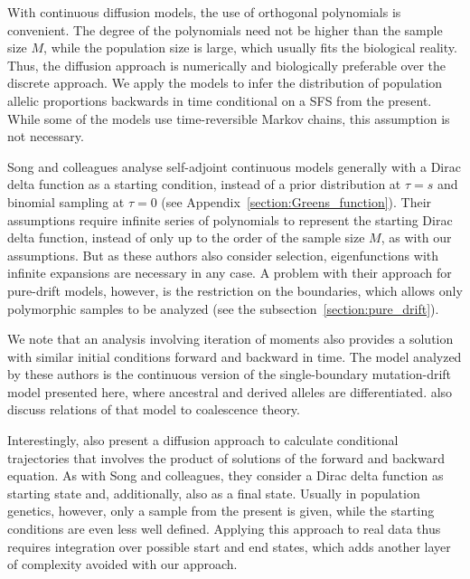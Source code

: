\documentclass[preprint]{elsarticle}
\begin{document}
With continuous diffusion models, the use of orthogonal polynomials is convenient. The degree of the polynomials need not be higher than the sample size $M$, while the population size is large, which usually fits the biological reality. Thus, the diffusion approach is numerically and biologically preferable over the discrete approach. We apply the models to infer the distribution of population allelic proportions backwards in time conditional on a SFS from the present. While some of the models use time-reversible Markov chains, this assumption is not necessary.%

Song and colleagues \citep{Song12,Stei13,Stei14,Zivk15} analyse self-adjoint continuous models generally with a Dirac delta function as a starting condition, instead of a prior distribution at $\tau=s$ and binomial sampling at $\tau=0$ (see Appendix~\ref{section:Greens_function}). Their assumptions require infinite series of polynomials to represent the starting Dirac delta function, instead of only up to the order of the sample size $M$, as with our assumptions. But as these authors also consider selection, eigenfunctions with infinite expansions are necessary in any case. A problem with their approach for pure-drift models, however, is the restriction on the boundaries, which allows only polymorphic samples to be analyzed (see the subsection~\ref{section:pure_drift}).

We note that an analysis involving iteration of moments \citep{Evan07,Zivk11} also provides a solution with similar initial conditions forward and backward in time. The model analyzed by these authors is the continuous version of the single-boundary mutation-drift model presented here, where ancestral and derived alleles are differentiated. %
\citet{Zivk11} also discuss relations of that model to coalescence theory.

Interestingly, \citet{Zhao13} also present a diffusion approach to calculate conditional trajectories that involves the product of solutions of the forward and backward equation. As with Song and colleagues, they consider a Dirac delta function as starting state and, additionally, also as a final state. Usually in population genetics, however, only a sample from the present is given, while the starting conditions are even less well defined. Applying this approach to real data thus requires integration over possible start and end states, which adds another layer of complexity avoided with our approach. 
\end{document}
